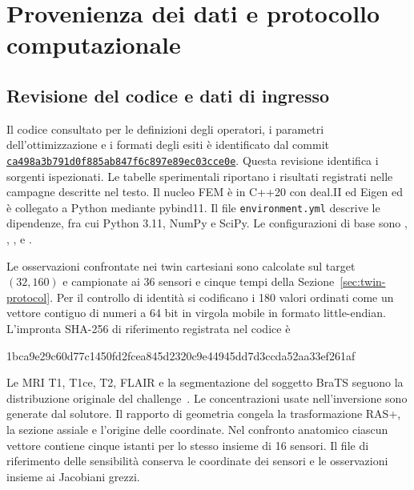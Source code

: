 \section{Provenienza dei dati e protocollo computazionale}
\label{app:repro}
\setcounter{figure}{0}\setcounter{table}{0}\setcounter{equation}{0}

\subsection{Revisione del codice e dati di ingresso}
Il codice consultato per le definizioni degli operatori, i parametri dell'ottimizzazione e i formati degli esiti è identificato dal commit
\href{https://github.com/GiovanniIacuzzo/Fractional-Poro-Viscoelastic/commit/ca498a3b791d0f885ab847f6c897e89ec03cce0e}{\texttt{ca498a3b791d0f885ab847f6c897e89ec03cce0e}}.
Questa revisione identifica i sorgenti ispezionati. Le tabelle sperimentali riportano i risultati registrati nelle campagne descritte nel testo. Il nucleo FEM è in C++20 con deal.II ed Eigen ed è collegato a Python mediante pybind11. Il file \texttt{environment.yml} descrive le dipendenze, fra cui Python 3.11, NumPy e SciPy. Le configurazioni di base sono , , ,  e .

Le osservazioni confrontate nei twin cartesiani sono calcolate sul target $(32,160)$ e campionate ai 36 sensori e cinque tempi della Sezione~\ref{sec:twin-protocol}. Per il controllo di identità si codificano i 180 valori ordinati come un vettore contiguo di numeri a 64 bit in virgola mobile in formato little-endian. L'impronta SHA-256 di riferimento registrata nel codice è
\begin{center}\small\ttfamily
1bca9e29c60d77c1450fd2fcea845d2320c9e44945dd7d3ccda52aa33ef261af
\end{center}
Le MRI T1, T1ce, T2, FLAIR e la segmentazione del soggetto BraTS seguono la distribuzione originale del challenge~\citep{brats2020protocol}. Le concentrazioni usate nell'inversione sono generate dal solutore. Il rapporto di geometria congela la trasformazione RAS+, la sezione assiale e l'origine delle coordinate. Nel confronto anatomico ciascun vettore contiene cinque istanti per lo stesso insieme di 16 sensori. Il file di riferimento delle sensibilità conserva le coordinate dei sensori e le osservazioni insieme ai Jacobiani grezzi.


